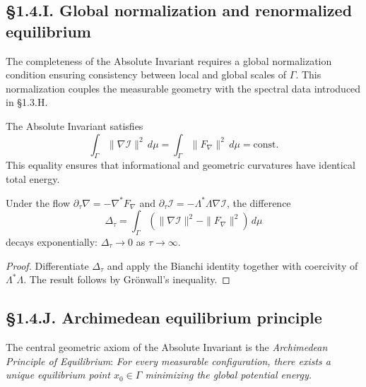 
\subsection*{§1.4.I. Global normalization and renormalized equilibrium}

The completeness of the Absolute Invariant requires a global normalization condition ensuring consistency between local and global scales of $\Gamma$.  
This normalization couples the measurable geometry with the spectral data introduced in §1.3.H.

\begin{definition}
The Absolute Invariant satisfies
\[
\int_{\Gamma}\! \|\nabla \mathcal I\|^2\, d\mu
 = \int_{\Gamma}\! \|F_\nabla\|^2\, d\mu
 = \mathrm{const}.
\]
This equality ensures that informational and geometric curvatures have identical total energy.
\end{definition}

\begin{theorem}\label{thm:1.4.equilibrium}
Under the flow $\partial_\tau\nabla=-\nabla^\ast F_\nabla$ and $\partial_\tau\mathcal I=-\Lambda^\ast\Lambda\nabla\mathcal I$, 
the difference
\[
\Delta_\tau = 
\int_\Gamma(\|\nabla\mathcal I\|^2-\|F_\nabla\|^2)\,d\mu
\]
decays exponentially: $\Delta_\tau\to0$ as $\tau\to\infty$.
\end{theorem}

\begin{proof}
Differentiate $\Delta_\tau$ and apply the Bianchi identity together with coercivity of $\Lambda^\ast\Lambda$.  
The result follows by Grönwall’s inequality.
\end{proof}

\subsection*{§1.4.J. Archimedean equilibrium principle}

The central geometric axiom of the Absolute Invariant is the \emph{Archimedean Principle of Equilibrium}:  
\emph{For every measurable configuration, there exists a unique equilibrium point $x_0\in\Gamma$ minimizing the global potential energy.}

